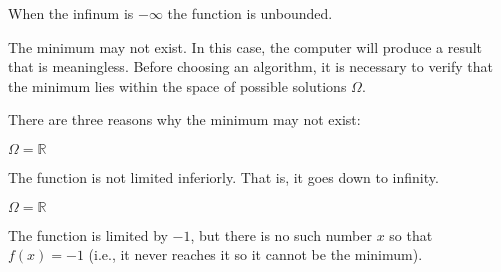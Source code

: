 When the infinum is \( -\infty \) the function is unbounded.

The minimum may not exist. In this case, the computer will produce a result that is meaningless. Before choosing an algorithm, it is necessary to verify that the minimum lies within the space of possible solutions \( \Omega \).

There are three reasons why the minimum may not exist:

\begin{minipage}{0.32\linewidth}
    \centering
    \begin{center}
        \( \Omega = \mathbb{R} \)

        \begin{adjustwidth}{0.05\linewidth}{0.05\linewidth}
            The function is not limited inferiorly. That is, it goes down to infinity.
        \end{adjustwidth}
    \end{center}
\end{minipage}
\begin{minipage}{0.33\linewidth}
    \centering
    \begin{center}
        \( \Omega = \mathbb{R} \)

        \begin{adjustwidth}{0.05\linewidth}{0.05\linewidth}
            The function is limited by \( -1 \), but there is no such number \( x \) so that \( f(x) = -1 \)  (i.e., it never reaches it so it cannot be the minimum).
        \end{adjustwidth}
    \end{center}
\end{minipage}
